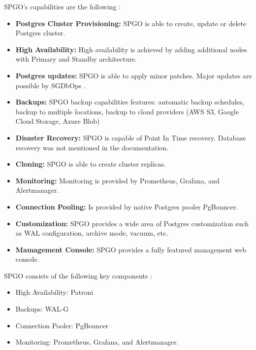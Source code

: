 
SPGO’s capabilities are the following \cite{OnGres}:
\begin{itemize}
    \item \textbf{Postgres Cluster Provisioning:} SPGO is able to create, update or delete Postgres cluster.
    \item \textbf{High Availability:} High availability is achieved by adding additional nodes with Primary and Standby architecture.
    \item \textbf{Postgres updates:} SPGO is able to apply minor patches. Major updates are possible by SGDbOps \cite{SPGODocuMajorUpdates}.
    \item \textbf{Backups:} SPGO backup capabilities features: automatic backup schedules, backup to multiple locations, backup to cloud providers (AWS S3, Google Cloud Storage, Azure Blob)
    \item \textbf{Disaster Recovery:} SPGO is capable of Point In Time recovery. Database recovery was not mentioned in the documentation.
    \item \textbf{Cloning:} SPGO is able to create cluster replicas.
    \item \textbf{Monitoring:} Monitoring is provided by Prometheus, Grafana, and Alertmanager.
    \item \textbf{Connection Pooling:} Is provided by native Postgres pooler PgBouncer.
    \item \textbf{Customization:} SPGO provides a wide area of Postgres customization such as WAL configuration, archive mode, vacuum, etc. \cite{SPGODocuCustomization}
    \item \textbf{Mamagement Console:} SPGO provides a fully featured management web console.

\end{itemize}

SPGO consists of the following key components \cite{PostgresOnKubernetes}:
\begin{itemize}
    \item High Availability: Patroni
    \item Backups: WAL-G
    \item Connection Pooler: PgBouncer
    \item Monitoring: Prometheus, Grafana, and Alertmanager.
\end{itemize}



